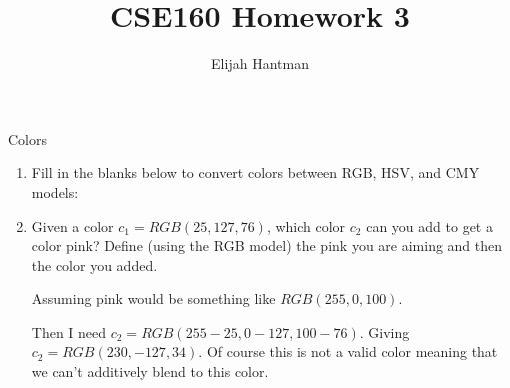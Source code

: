 \documentclass{article}
\title{CSE160 Homework 3}
\author{Elijah Hantman}
\begin{document}
    \maketitle

    {\large Colors}
    \begin{enumerate}
        \item Fill in the blanks below to convert colors
            between RGB, HSV, and CMY models:

            \begin{table}[h]
            \end{table}

        \item Given a color $c_1 = RGB(25,127,76)$, which color $c_2$ can you add to get a color pink?
            Define (using the RGB model) the pink you are aiming and then the color you
            added.

            \begin{mdframed}
                Assuming pink would be something like $RGB(255, 0, 100)$. 

                Then I need $c_2 = RGB(255 - 25, 0 - 127, 100 - 76)$.
                Giving $c_2 = RGB(230, -127, 34)$. Of course this is not
                a valid color meaning that we can't additively blend to
                this color.


\end{mdframed}
\end{enumerate}
\end{document}
